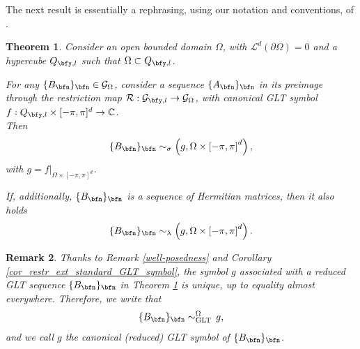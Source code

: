 \documentclass{amsart}
\newtheorem{thm}{Theorem}[section]
\newtheorem{rem}[thm]{Remark}
\begin{document}

The next result is essentially a rephrasing, using our notation and conventions, of \cite[Lemma 4.4]{Barb}.

\begin{thm}\label{spectra_reduced_GLT}
    Consider an open bounded domain $\Omega$, with $\mathcal{L}^d(\partial\Omega)=0$ and a hypercube $Q_{\bfy,l}$ such that $\Omega\subset Q_{\bfy,l}$. 
    
    For any $\{B_{\bfn}\}_\bfn\in\mathcal{G}_{\Omega}$, consider a sequence $\{A_{\bfn}\}_\bfn$ in its preimage through the restriction map $\mathcal{R}:\mathcal{G}_{\bfy,l}\to\mathcal{G}_{\Omega}$, with canonical GLT symbol $f:Q_{\bfy,l}\times[-\pi,\pi]^d\to\mathbb{C}$.\\
    Then
    \begin{equation*}
        \{B_{\bfn}\}_{\bfn}\sim_{\sigma}\left(g,\Omega\times\left[-\pi,\pi\right]^d\right),
    \end{equation*}
    with $g=f|_{\Omega\times[-\pi,\pi]^d}$.
    
    If, additionally, $\{B_\bfn\}_\bfn$ is a sequence of Hermitian matrices, then it also holds 
    \begin{equation*}
        \{B_{\bfn}\}_{\bfn}\sim_{\lambda}\left(g,\Omega\times\left[-\pi,\pi\right]^d\right).
    \end{equation*}
\end{thm}

\begin{rem}
    Thanks to Remark \ref{well-posedness} and Corollary \ref{cor_restr_ext_standard_GLT_symbol}, the symbol $g$ associated with a reduced GLT sequence $\{B_\bfn\}_\bfn$ in Theorem \ref{spectra_reduced_GLT} is unique, up to equality almost everywhere. Therefore, we write that
    \begin{equation*}
        \{B_{\bfn}\}_{\bfn}\sim_{\mathrm{GLT}}^{\Omega}\,g,
    \end{equation*}
    and we call $g$ the canonical (reduced) GLT symbol of $\{B_\bfn\}_\bfn$.
\end{rem}
\end{document}
